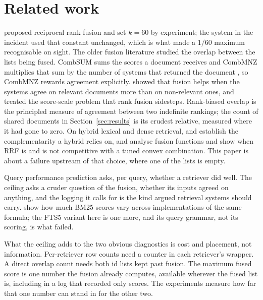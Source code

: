 \documentclass[11pt]{article}
\begin{document}
\section{Related work}
\label{sec:related}

\citet{cormack2009rrf} proposed reciprocal rank fusion and set $k = 60$ by experiment; the system in the incident used that constant unchanged, which is what made a $1/60$ maximum recognisable on sight. The older fusion literature studied the overlap between the lists being fused. CombSUM sums the scores a document receives and CombMNZ multiplies that sum by the number of systems that returned the document \citep{fox1994combination}, so CombMNZ rewards agreement explicitly. \citet{lee1997analyses} showed that fusion helps when the systems agree on relevant documents more than on non-relevant ones, and \citet{montague2001normalization} treated the score-scale problem that rank fusion sidesteps. Rank-biased overlap \citep{webber2010rbo} is the principled measure of agreement between two indefinite rankings; the count of shared documents in Section~\ref{sec:results} is its crudest relative, measured where it had gone to zero. On hybrid lexical and dense retrieval, \citet{luan2021sparse} and \citet{gao2021clear} establish the complementarity a hybrid relies on, and \citet{bruch2023fusion} analyse fusion functions and show when RRF is and is not competitive with a tuned convex combination. This paper is about a failure upstream of that choice, where one of the lists is empty.

Query performance prediction \citep{cronentownsend2002qpp} asks, per query, whether a retriever did well. The ceiling asks a cruder question of the fusion, whether its inputs agreed on anything, and the logging it calls for is the kind \citet{cooper1998monitoring} argued retrieval systems should carry. \citet{kamphuis2020bm25} show how much BM25 scores vary across implementations of the same formula; the FTS5 variant here is one more, and its query grammar, not its scoring, is what failed.

What the ceiling adds to the two obvious diagnostics is cost and placement, not information. Per-retriever row counts need a counter in each retriever's wrapper. A direct overlap count needs both id lists kept past fusion. The maximum fused score is one number the fusion already computes, available wherever the fused list is, including in a log that recorded only scores. The experiments measure how far that one number can stand in for the other two.
\end{document}

